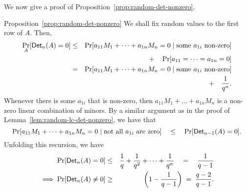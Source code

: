 We now give a proof of Proposition~\ref{prop:random-det-nonzero}. 

\begin{proofof}{Proposition~\ref{prop:random-det-nonzero}}
We shall fix random values to the first row of $A$. Then,
\begin{eqnarray*}
\Pr_{A}[\mathsf{Det}_n(A) = 0] & \leq & \Pr[a_{11} M_1 + \dots + a_{1n} M_n = 0 \;|\;\text{some $a_{1i}$ non-zero}]\\
& &\quad + \quad \Pr[a_{11}=\dots = a_{1n} = 0]\\
 & = & \Pr[a_{11} M_1 + \dots + a_{1n} M_n = 0 \;|\;\text{some $a_{1i}$ non-zero}]\\
 & & \quad + \quad \frac{1}{q^n}.
\end{eqnarray*}
Whenever there is some $a_{1i}$ that is non-zero, then $a_{11}M_1 +
\dots + a_{1n}M_n$ is a non-zero linear combination of minors. By a similar argument as in the proof of Lemma~\ref{lem:random-lc-det-nonzero}, we have that
$$
\Pr[a_{11} M_1 + \dots + a_{1n}M_n = 0\;|\;\text{not all $a_{1i}$ are zero}] \quad \leq \quad \Pr[\mathsf{Det}_{n-1}(A) = 0].
$$
Unfolding this recursion, we have
\begin{eqnarray*}
\Pr[\mathsf{Det}_n(A) = 0] & \leq & \frac{1}{q} + \frac{1}{q^2} + \dots + \frac{1}{q^n} \quad=\quad \frac{1}{q-1}\\
\implies \Pr[\mathsf{Det}_n(A) \neq 0] & \geq & \left(1 - \frac{1}{q-1}\right) \;=\; \frac{q-2}{q-1}.
\end{eqnarray*}
\end{proofof}



